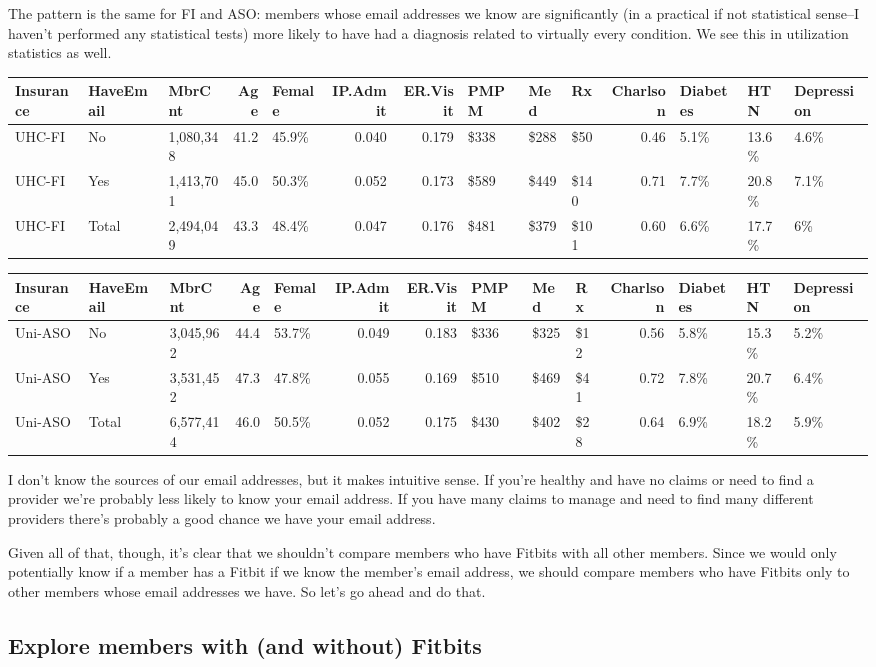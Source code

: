 \documentclass[]{article}
\begin{document}
The pattern is the same for FI and ASO: members whose email addresses we
know are significantly (in a practical if not statistical sense--I
haven't performed any statistical tests) more likely to have had a
diagnosis related to virtually every condition. We see this in
utilization statistics as well.

\begin{longtable}[]{@{}lllrlrrlllrlll@{}}
\toprule
Insurance & HaveEmail & MbrCnt & Age & Female & IP.Admit & ER.Visit &
PMPM & Med & Rx & Charlson & Diabetes & HTN & Depression\tabularnewline
\midrule
\endhead
UHC-FI & No & 1,080,348 & 41.2 & 45.9\% & 0.040 & 0.179 & \$338 & \$288
& \$50 & 0.46 & 5.1\% & 13.6\% & 4.6\%\tabularnewline
UHC-FI & Yes & 1,413,701 & 45.0 & 50.3\% & 0.052 & 0.173 & \$589 & \$449
& \$140 & 0.71 & 7.7\% & 20.8\% & 7.1\%\tabularnewline
UHC-FI & Total & 2,494,049 & 43.3 & 48.4\% & 0.047 & 0.176 & \$481 &
\$379 & \$101 & 0.60 & 6.6\% & 17.7\% & 6\%\tabularnewline
\bottomrule
\end{longtable}

\begin{longtable}[]{@{}lllrlrrlllrlll@{}}
\toprule
Insurance & HaveEmail & MbrCnt & Age & Female & IP.Admit & ER.Visit &
PMPM & Med & Rx & Charlson & Diabetes & HTN & Depression\tabularnewline
\midrule
\endhead
Uni-ASO & No & 3,045,962 & 44.4 & 53.7\% & 0.049 & 0.183 & \$336 & \$325
& \$12 & 0.56 & 5.8\% & 15.3\% & 5.2\%\tabularnewline
Uni-ASO & Yes & 3,531,452 & 47.3 & 47.8\% & 0.055 & 0.169 & \$510 &
\$469 & \$41 & 0.72 & 7.8\% & 20.7\% & 6.4\%\tabularnewline
Uni-ASO & Total & 6,577,414 & 46.0 & 50.5\% & 0.052 & 0.175 & \$430 &
\$402 & \$28 & 0.64 & 6.9\% & 18.2\% & 5.9\%\tabularnewline
\bottomrule
\end{longtable}

I don't know the sources of our email addresses, but it makes intuitive
sense. If you're healthy and have no claims or need to find a provider
we're probably less likely to know your email address. If you have many
claims to manage and need to find many different providers there's
probably a good chance we have your email address.

Given all of that, though, it's clear that we shouldn't compare members
who have Fitbits with all other members. Since we would only potentially
know if a member has a Fitbit if we know the member's email address, we
should compare members who have Fitbits only to other members whose
email addresses we have. So let's go ahead and do that.

\subsection{Explore members with (and without)
Fitbits}\label{explore-members-with-and-without-fitbits}
\end{document}
